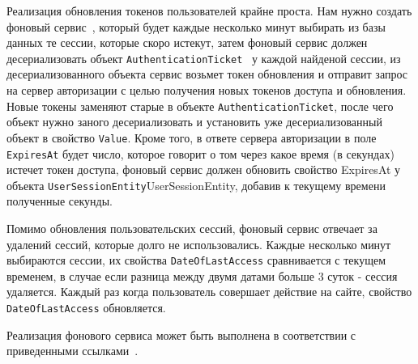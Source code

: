 Реализация обновления токенов пользователей крайне проста.
Нам нужно создать фоновый сервис~\cite{microsoftHostedservice2023}, который будет каждые несколько минут выбирать из базы данных те сессии, которые скоро истекут,
затем фоновый сервис должен десериализовать объект \texttt{AuthenticationTicket}~\cite{microsoftAuthenticationTicket2023} у каждой найденой сессии, из десериализованного объекта
сервис возьмет токен обновления и отправит запрос на сервер авторизации с целью получения новых токенов доступа и обновления.
Новые токены заменяют старые в объекте \texttt{AuthenticationTicket}, после чего объект нужно заного десериализовать и установить
уже десериализованный объект в свойство \texttt{Value}.
Кроме того, в ответе сервера авторизации в поле \texttt{ExpiresAt} будет число, которое говорит о том через какое время (в секундах) истечет токен доступа,
фоновый сервис должен обновить свойство ExpiresAt у объекта \texttt{UserSessionEntity}UserSessionEntity, добавив к текущему времени полученные секунды.

Помимо обновления пользовательских сессий, фоновый сервис отвечает за удалений сессий, которые долго не использовались.
Каждые несколько минут выбираются сессии, их свойства \texttt{DateOfLastAccess} сравнивается с текущем временем, в случае если разница
между двумя датами больше 3 суток - сессия удаляется.
Каждый раз когда пользователь совершает действие на сайте, свойство \texttt{DateOfLastAccess} обновляется.

Реализация фонового сервиса может быть выполнена в соответствии с приведенными ссылками~\cite{backroundService_2023, configurationBackgroundService_2023}.